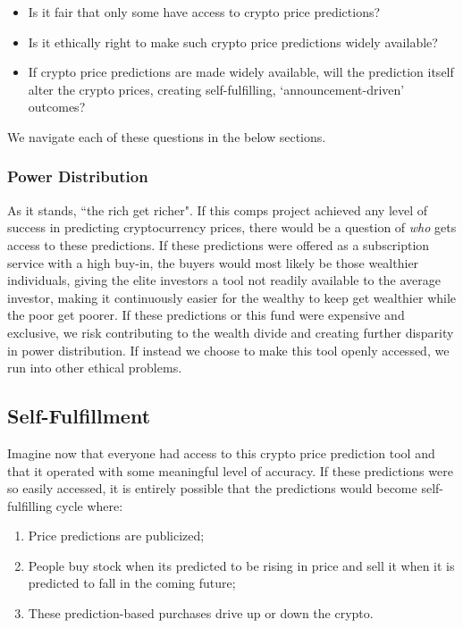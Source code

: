 \documentclass[10pt,twocolumn]{article}
\begin{document}
\begin{itemize}
    \item Is it fair that only some have access to crypto price predictions?
    \item Is it ethically right to make such crypto price predictions widely available?
    \item If crypto price predictions are made widely available, will the prediction itself alter the crypto prices, creating self-fulfilling, `announcement-driven' outcomes?
\end{itemize}

We navigate each of these questions in the below sections.

\subsubsection{Power Distribution}

As it stands, ``the rich get richer". If this comps project achieved any level of success in predicting cryptocurrency prices, there would be a question of \textit{who} gets access to these predictions. If these predictions were offered as a subscription service with a high buy-in, the buyers would most likely be those wealthier individuals, giving the elite investors a tool not readily available to the average investor, making it continuously easier for the wealthy to keep get wealthier while the poor get poorer. If these predictions or this fund were expensive and exclusive, we risk contributing to the wealth divide and creating further disparity in power distribution. If instead we choose to make this tool openly accessed, we run into other ethical problems.

\subsection{Self-Fulfillment}

Imagine now that everyone had access to this crypto price prediction tool and that it operated with some meaningful level of accuracy. If these predictions were so easily accessed, it is entirely possible that the predictions would become self-fulfilling cycle where:

\begin{enumerate}
    \item Price predictions are publicized;
    \item People buy stock when its predicted to be rising in price and sell it when it is predicted to fall in the coming future;
    \item These prediction-based purchases drive up or down the crypto.
\end{enumerate}
\end{document}
